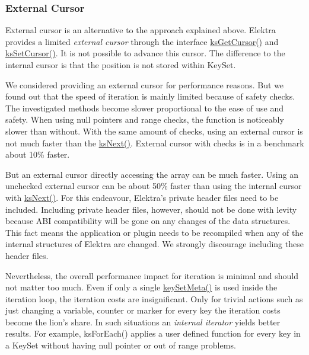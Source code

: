\subsubsection*{External Cursor}

External cursor is an alternative to the approach explained above. Elektra provides a limited {\itshape external cursor} through the interface {\ttfamily \hyperlink{group__keyset_gaffe507ab9281c322eb16c3e992075d29}{ks\+Get\+Cursor()}} and {\ttfamily \hyperlink{group__keyset_gad94c9ffaa3e8034564c0712fd407c345}{ks\+Set\+Cursor()}}. It is not possible to advance this cursor. The difference to the internal cursor is that the position is not stored within {\ttfamily Key\+Set}.

We considered providing an external cursor for performance reasons. But we found out that the speed of iteration is mainly limited because of safety checks. The investigated methods become slower proportional to the ease of use and safety. When using null pointers and range checks, the function is noticeably slower than without. With the same amount of checks, using an external cursor is not much faster than the {\ttfamily \hyperlink{group__keyset_ga317321c9065b5a4b3e33fe1c399bcec9}{ks\+Next()}}. External cursor with checks is in a benchmark about 10\% faster.

But an external cursor directly accessing the array can be much faster. Using an unchecked external cursor can be about 50\% faster than using the internal cursor with \hyperlink{group__keyset_ga317321c9065b5a4b3e33fe1c399bcec9}{ks\+Next()}. For this endeavour, Elektra's private header files need to be included. Including private header files, however, should not be done with levity because A\+B\+I compatibility will be gone on any changes of the data structures. This fact means the application or plugin needs to be recompiled when any of the internal structures of Elektra are changed. We strongly discourage including these header files.

Nevertheless, the overall performance impact for iteration is minimal and should not matter too much. Even if only a single {\ttfamily \hyperlink{group__keymeta_gae1f15546b234ffb6007d8a31178652b9}{key\+Set\+Meta()}} is used inside the iteration loop, the iteration costs are insignificant. Only for trivial actions such as just changing a variable, counter or marker for every key the iteration costs become the lion's share. In such situations an {\itshape internal iterator} yields better results. For example, {\ttfamily ks\+For\+Each()} applies a user defined function for every key in a {\ttfamily Key\+Set} without having null pointer or out of range problems.

